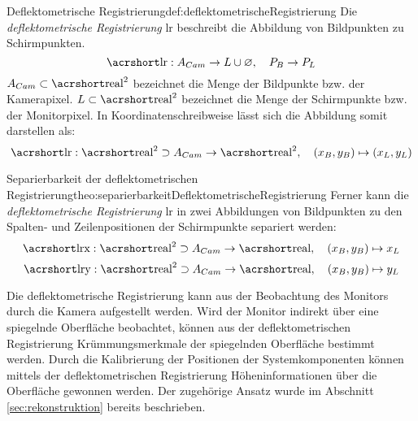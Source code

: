\begin{Definition}{Deflektometrische Registrierung}{def:deflektometrischeRegistrierung}
	Die \textit{deflektometrische Registrierung} \acrshort{lr} beschreibt die Abbildung von Bildpunkten zu Schirmpunkten. \cite{kit_werling}
	\begin{equation*}
		\acrshortmath{lr} : A_{Cam} \rightarrow L \cup \varnothing ,\quad P_{B} \rightarrow P_{L}
	\end{equation*}
	$ A_{Cam} \subset \acrshortmath{real}^{2} $ bezeichnet die Menge der Bildpunkte bzw. der Kamerapixel.
	$ L \subset \acrshortmath{real}^{2} $ bezeichnet die Menge der Schirmpunkte bzw. der Monitorpixel.
	In Koordinatenschreibweise lässt sich die Abbildung somit darstellen als:
	\begin{equation*}\label{eq:deflektometrischeRegistrierungAbbildung}
		\acrshortmath{lr} : \acrshortmath{real}^{2} \supset A_{Cam} \rightarrow \acrshortmath{real}^2 ,\quad (x_{B}, y_{B}) \mapsto (x_{L}, y_{L})
	\end{equation*}
\end{Definition}

\begin{Satz}{Separierbarkeit der deflektometrischen Registrierung}{theo:separierbarkeitDeflektometrischeRegistrierung}
Ferner kann die \textit{deflektometrische Registrierung} \acrshort{lr} in zwei Abbildungen von Bildpunkten zu den Spalten- und Zeilenpositionen der Schirmpunkte separiert werden:
	\begin{equation*}
		\acrshortmath{lrx} : \acrshortmath{real}^{2} \supset A_{Cam} \rightarrow \acrshortmath{real} ,\quad (x_{B}, y_{B}) \mapsto x_{L}
	\end{equation*}
	\begin{equation*}
		\acrshortmath{lry} : \acrshortmath{real}^{2} \supset A_{Cam} \rightarrow \acrshortmath{real} ,\quad (x_{B}, y_{B}) \mapsto y_{L}
	\end{equation*}
\end{Satz}

\noindent
Die deflektometrische Registrierung kann aus der Beobachtung des Monitors durch die Kamera aufgestellt werden.
Wird der Monitor indirekt über eine spiegelnde Oberfläche beobachtet, können aus der deflektometrischen Registrierung Krümmungsmerkmale der spiegelnden Oberfläche bestimmt werden.
Durch die Kalibrierung der Positionen der Systemkomponenten können mittels der deflektometrischen Registrierung Höheninformationen über die Oberfläche gewonnen werden.
Der zugehörige Ansatz wurde im Abschnitt \ref{sec:rekonstruktion} bereits beschrieben.

